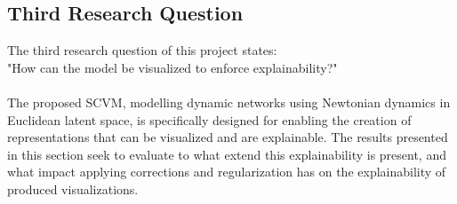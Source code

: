 \subsection{Third Research Question}
\label{sec:ResearchQuestion3}
The third research question of this project states:
\\
"How can the model be visualized to enforce explainability?"
\\\\
The proposed SCVM, modelling dynamic networks using Newtonian dynamics in Euclidean latent space, is specifically designed for enabling the creation of representations that can be visualized and are explainable.
The results presented in this section seek to evaluate to what extend this explainability is present, and what impact applying corrections and regularization has on the explainability of produced visualizations.


